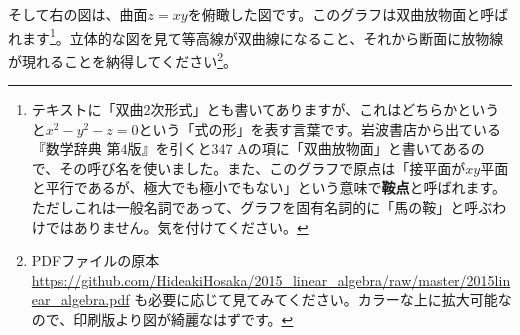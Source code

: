 \begin{figure}[h!tbp]
\centering
{} \quad
{}
\end{figure}

そして右の図は、曲面$z = xy$を俯瞰した図です。このグラフは双曲放物面と呼ばれます\footnote{テキストに「双曲$2$次形式」とも書いてありますが、これはどちらかというと$x^2-y^2-z=0$という「式の形」を表す言葉です。岩波書店から出ている『数学辞典 第$4$版』を引くと347 Aの項に「双曲放物面」と書いてあるので、その呼び名を使いました。また、このグラフで原点は「接平面が$xy$平面と平行であるが、極大でも極小でもない」という意味で\textbf{鞍点}と呼ばれます。ただしこれは一般名詞であって、グラフを固有名詞的に「馬の鞍」と呼ぶわけではありません。気を付けてください。}。立体的な図を見て等高線が双曲線になること、それから断面に放物線が現れることを納得してください\footnote{PDFファイルの原本 \url{https://github.com/HideakiHosaka/2015_linear_algebra/raw/master/2015linear_algebra.pdf} も必要に応じて見てみてください。カラーな上に拡大可能なので、印刷版より図が綺麗なはずです。}。

\begin{figure}[h!tbp]
\centering
{} \quad
{}
\end{figure}

